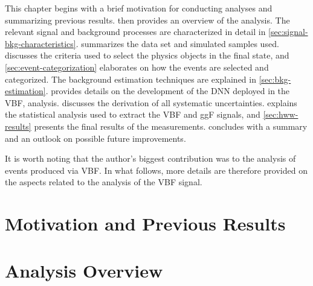 This chapter begins with a brief motivation for conducting \HWW analyses and summarizing previous results.
 then provides an overview of the analysis.
The relevant signal and background processes are characterized in detail in \cref{sec:signal-bkg-characteristics}. 
 summarizes the data set and simulated samples used.
 discusses the criteria used to select the physics objects in the final state, and \cref{sec:event-categorization} elaborates on how the events are selected and categorized. 
The background estimation techniques are explained in \cref{sec:bkg-estimation}. 
 provides details on the development of the DNN deployed in the VBF, \HWW analysis. 
 discusses the derivation of all systematic uncertainties. 
 explains the statistical analysis used to extract the VBF and ggF signals, and \cref{sec:hww-results} presents the final results of the measurements.
 concludes with a summary and an outlook on possible future improvements.

It is worth noting that the author's biggest contribution was to the analysis of \HWW events produced via VBF. In what follows, more details are therefore provided on the aspects related to the analysis of the VBF signal.



\section{Motivation and Previous Results}
\label{sec:motivation}


\section{Analysis Overview}
\label{sec:analysis-overview}


